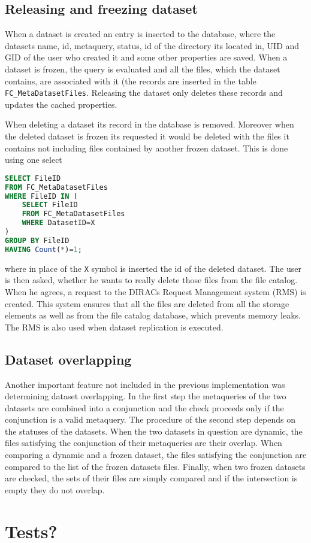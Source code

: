 \subsection{Releasing and freezing dataset}

When a dataset is created an entry is inserted to the database, where the datasets name, id, metaquery, 
status, id of the directory its located in, UID and GID of the user who created it and some other 
properties are saved. When a dataset is frozen, the query is evaluated and all the files, which the
dataset contains, are associated with it (the records are inserted in the table \texttt{FC\_MetaDatasetFiles}.
Releasing the dataset only deletes these records and updates the cached properties. 

When deleting a dataset its record in the database is removed. Moreover when the deleted dataset is frozen
its requested it would be deleted with the files it contains not including files contained by another frozen
dataset. This is done using one select

\begin{lstlisting}[language=sql]
SELECT FileID 
FROM FC_MetaDatasetFiles 
WHERE FileID IN (
	SELECT FileID 
	FROM FC_MetaDatasetFiles 
	WHERE DatasetID=X
) 
GROUP BY FileID 
HAVING Count(*)=1;
\end{lstlisting}

where in place of the \texttt{X} symbol is inserted the id of the deleted dataset. The user is then 
asked, whether he wants to really delete those files from the file catalog. When he agrees, a request to
the DIRACs Request Management system (RMS) \cite{RMS} is created. This system ensures that all the files
are deleted from all the storage elements as well as from the file catalog database, 
which prevents memory leaks. The RMS is also used when dataset replication is executed.

\subsection{Dataset overlapping}

Another important feature not included in the previous implementation was determining 
dataset overlapping. In the first step the metaqueries of the two datasets are combined
into a conjunction and the check proceeds only if the conjunction is a valid metaquery.
The procedure of the second step depends on the statuses of the datasets. When the two
datasets in question are dynamic, the files satisfying the conjunction of their metaqueries
are their overlap. When comparing a dynamic and a frozen dataset, the files satisfying 
the conjunction are compared to the list of the frozen datasets files. Finally, when 
two frozen datasets are checked, the sets of their files are simply compared and if 
the intersection is empty they do not overlap.


\section{Tests?}
